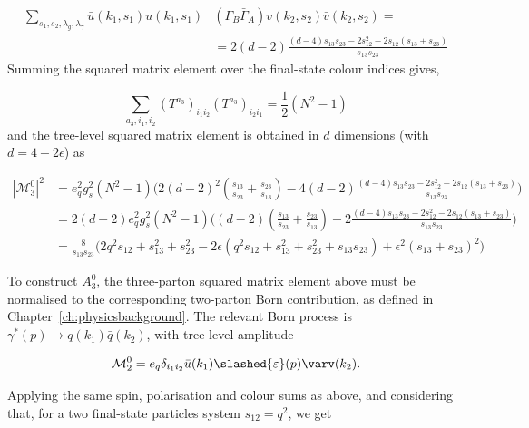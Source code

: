\begin{equation}
    \begin{split}
        \sum_{s_1,s_2,\lambda_g,\lambda_\gamma} \bar u(k_1,s_1) u(k_1,s_1)&\left(\Gamma_B \bar\Gamma_A\right)v(k_2,s_2)\bar v(k_2,s_2) = \\
                                                                        &=2(d-2)\frac{(d-4)s_{13}s_{23}-2s_{12}^2-2s_{12}(s_{13}+s_{23})}{s_{13}s_{23}}
    \end{split}
\end{equation}
Summing the squared matrix element over the final-state colour indices gives,

\begin{equation}
    \sum_{a_3,i_1,i_2} (T^{a_3})_{i_1i_2}(T^{a_3})_{i_2i_1} = \frac12(N^2-1)
\end{equation}
and the tree-level squared matrix element is obtained in $d$ dimensions (with $d=4-2\epsilon$) as

\begin{equation}\label{eq:M30interference}
    \begin{split}
        |\mathcal M_3^0|^2 &= e_q^2g_s^2(N^2-1)\Bigg(2(d-2)^2\left(\frac{s_{13}}{s_{23}}+\frac{s_{23}}{s_{13}}\right)-4(d-2)\frac{(d-4)s_{13}s_{23}-2s_{12}^2-2s_{12}(s_{13}+s_{23})}{s_{13}s_{23}}\Bigg)\\
                           &= 2(d-2)e_q^2g_s^2(N^2-1)\Bigg((d-2)\left(\frac{s_{13}}{s_{23}}+\frac{s_{23}}{s_{13}}\right)-2\frac{(d-4)s_{13}s_{23}-2s_{12}^2-2s_{12}(s_{13}+s_{23})}{s_{13}s_{23}}\Bigg)\\
                           &= \frac8{s_{13}s_{23}}\Bigg(2q^2s_{12}+s_{13}^2+s_{23}^2-2\epsilon\left(q^2s_{12}+s_{13}^2+s_{23}^2+s_{13}s_{23}\right)+\epsilon^2\left(s_{13}+s_{23}\right)^2\Bigg)
    \end{split}
\end{equation}

To construct $A_3^0$, the three-parton squared matrix element above must be normalised to the
corresponding two-parton Born contribution, as defined in Chapter~\ref{ch:physicsbackground}. The
relevant Born process is $\gamma^*(p)\to q(k_1)\bar q(k_2)$,
with tree-level amplitude

\begin{equation}
    \mathcal M_2^0 = e_q\delta_{i_1i_2}\bar u(k_1)\slashed{\varepsilon}(p)\varv(k_2).
\end{equation}

Applying the same spin, polarisation and colour sums as above, and considering that, for a two
final-state particles system $s_{12}=q^2$, we get

